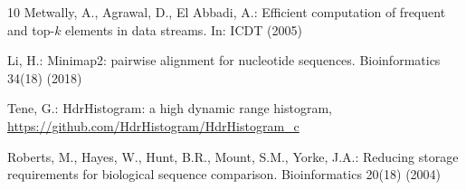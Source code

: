 \documentclass[runningheads]{llncs}
\begin{document}
\begin{thebibliography}{10}
 Metwally, A., Agrawal, D., El Abbadi, A.: Efficient computation of
frequent and top-$k$ elements in data streams. In: ICDT (2005)

 Li, H.: Minimap2: pairwise alignment for nucleotide sequences.
Bioinformatics 34(18) (2018)

 Tene, G.: HdrHistogram: a high dynamic range histogram,
\url{https://github.com/HdrHistogram/HdrHistogram_c}

 Roberts, M., Hayes, W., Hunt, B.R., Mount, S.M., Yorke, J.A.: Reducing
storage requirements for biological sequence comparison. Bioinformatics 20(18) (2004)

\end{thebibliography}
\end{document}
